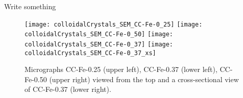 \documentclass[\main/dresen_thesis.tex]{subfiles}
\begin{document}
  \label{sec:colloidalCrystals:layers:sem}
  Write something
  \begin{figure}[tb]
    \centering
    \texttt{[image: colloidalCrystals\_SEM\_CC-Fe-0\_25]}
    \texttt{[image: colloidalCrystals\_SEM\_CC-Fe-0\_50]}
    \texttt{[image: colloidalCrystals\_SEM\_CC-Fe-0\_37]}
    \texttt{[image: colloidalCrystals\_SEM\_CC-Fe-0\_37\_xs]}
    \caption{\label{fig:colloidalCrystals:nuclearStructure:sem}Micrographs CC-Fe-0.25 (upper left), CC-Fe-0.37 (lower left), CC-Fe-0.50 (upper right) viewed from the top and a cross-sectional view of CC-Fe-0.37 (lower right).}
  \end{figure}




\end{document}
